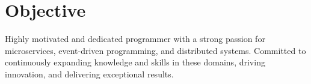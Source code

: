 \documentclass[../main.tex]{subfiles}
\begin{document}
  \section{Objective}
  \begin{category}
    \citembullet  Highly motivated and dedicated programmer with
      a strong passion for microservices, event-driven programming,
      and distributed systems. Committed to continuously expanding 
      knowledge and skills in these domains, driving innovation, 
      and delivering exceptional results.
  \end{category}
\end{document}
